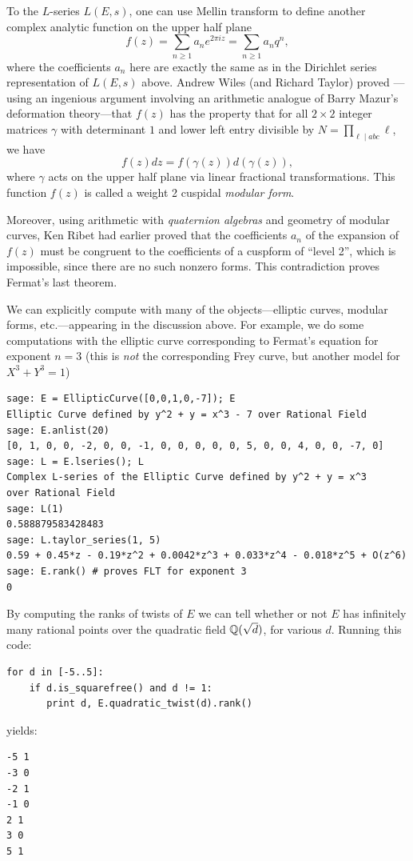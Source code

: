 \documentclass{book}
\begin{document}
To the $L$-series $L(E,s)$, one can use
Mellin transform to define another complex analytic function
on the upper half plane
$$
f(z) = \sum_{n\geq 1} a_n e^{2\pi i z} = \sum_{n\geq 1} a_n q^n,
$$
where the coefficients $a_n$ here are exactly the same as
in the Dirichlet series representation of $L(E,s)$ above.
Andrew Wiles (and Richard Taylor) proved \cite{wiles:fermat}---using
an ingenious
argument involving an arithmetic analogue of Barry Mazur's
deformation theory---that
$f(z)$ has the property that for
all $2\times 2$ integer matrices
$\gamma$ with determinant $1$ and lower left entry divisible
by $N=\prod_{\ell\mid abc} \ell$, we have
$$
  f(z) dz = f(\gamma(z)) d(\gamma(z)),
$$
where $\gamma$ acts on the upper half plane
via linear fractional transformations.  This function
$f(z)$ is called a weight 2 cuspidal {\em modular form}.

Moreover, using arithmetic with {\em quaternion algebras} and
geometry of modular curves, Ken Ribet had earlier proved that
the coefficients $a_n$ of the expansion of
$f(z)$ must be congruent to the coefficients
of a cuspform of ``level 2'', which is
impossible, since there are no such nonzero forms.
This contradiction proves Fermat's last theorem.

We can explicitly compute with many of the
objects---elliptic curves, modular forms, etc.---appearing
in the discussion above.
For example, we do some computations with the elliptic
curve corresponding to Fermat's equation for exponent $n=3$
(this is {\em not} the corresponding Frey curve, but another
model for $X^3+Y^3=1$)
\begin{lstlisting}
sage: E = EllipticCurve([0,0,1,0,-7]); E
Elliptic Curve defined by y^2 + y = x^3 - 7 over Rational Field
sage: E.anlist(20)
[0, 1, 0, 0, -2, 0, 0, -1, 0, 0, 0, 0, 0, 5, 0, 0, 4, 0, 0, -7, 0]
sage: L = E.lseries(); L
Complex L-series of the Elliptic Curve defined by y^2 + y = x^3
over Rational Field
sage: L(1)
0.588879583428483
sage: L.taylor_series(1, 5)
0.59 + 0.45*z - 0.19*z^2 + 0.0042*z^3 + 0.033*z^4 - 0.018*z^5 + O(z^6)
sage: E.rank() # proves FLT for exponent 3
0
\end{lstlisting}
By computing the ranks of twists of $E$ we can tell whether or
not $E$ has infinitely many rational points over the quadratic
field $\mathbb{Q}(\sqrt{d})$, for various $d$.  Running this code:
\begin{lstlisting}
for d in [-5..5]:
    if d.is_squarefree() and d != 1:
       print d, E.quadratic_twist(d).rank()
\end{lstlisting}
yields:
\begin{lstlisting}
-5 1
-3 0
-2 1
-1 0
2 1
3 0
5 1
\end{lstlisting}
\end{document}
